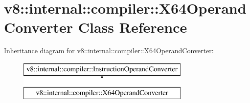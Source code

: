 \hypertarget{classv8_1_1internal_1_1compiler_1_1_x64_operand_converter}{}\section{v8\+:\+:internal\+:\+:compiler\+:\+:X64\+Operand\+Converter Class Reference}
\label{classv8_1_1internal_1_1compiler_1_1_x64_operand_converter}
Inheritance diagram for v8\+:\+:internal\+:\+:compiler\+:\+:X64\+Operand\+Converter\+:\begin{figure}[H]
\begin{center}
\leavevmode
\includegraphics[height=2.000000cm]{classv8_1_1internal_1_1compiler_1_1_x64_operand_converter}
\end{center}
\end{figure}
